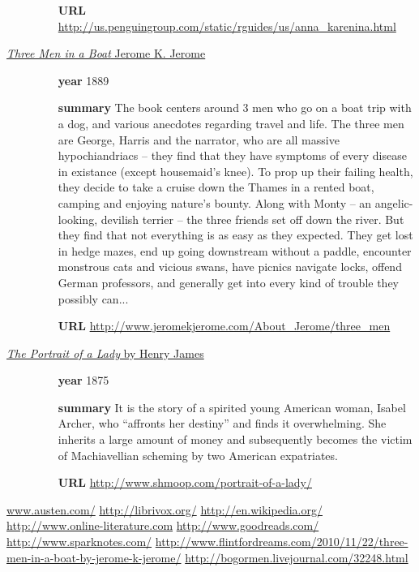 \documentclass[a4paper,11pt,oneside]{book}
\begin{document}
\begin{description}
\begin{itemize}
	\item [{\bf URL}] \url{http://us.penguingroup.com/static/rguides/us/anna_karenina.html}
	\end{itemize}
\item [\underline{{\it Three Men in a Boat} Jerome K. Jerome}] 
	\begin{itemize}
	\item [{\bf year}] 1889
	\item [{\bf summary}] The book centers around 3 men who go on a boat trip with a dog, and various anecdotes regarding travel and life. The three men are George, Harris and the narrator, who are all massive hypochiandriacs -- they find that they have symptoms of every disease in existance (except housemaid's knee). To prop up their failing health, they decide to take a cruise down the Thames in a rented boat, camping and enjoying nature's bounty. Along with Monty -- an angelic-looking, devilish terrier -- the three friends set off down the river. But they find that not everything is as easy as they expected. They get lost in hedge mazes, end up going downstream without a paddle, encounter monstrous cats and vicious swans, have picnics navigate locks, offend German professors, and generally get into every kind of trouble they possibly can...

	\item [{\bf URL}] \url{http://www.jeromekjerome.com/About_Jerome/three_men}
	\end{itemize}
\item [\underline{{\it The Portrait of a Lady} by Henry James}] 
	\begin{itemize}
	\item [{\bf year}] 1875
	\item [{\bf summary}] It is the story of a spirited young American woman, Isabel Archer, who “affronts her destiny” and finds it overwhelming. She inherits a large amount of money and subsequently becomes the victim of Machiavellian scheming by two American expatriates. 
	\item [{\bf URL}] \url{http://www.shmoop.com/portrait-of-a-lady/}
	\end{itemize}
\end{description}


\pagebreak
\begin{thebibliography}{XXX}
	 \url{www.austen.com/}
	 \url{http://librivox.org/}
	 \url{http://en.wikipedia.org/}
	 \url{http://www.online-literature.com}
	 \url{http://www.goodreads.com/}
	 \url{http://www.sparknotes.com/}
	 \url{http://www.flintfordreams.com/2010/11/22/three-men-in-a-boat-by-jerome-k-jerome/}
	 \url{http://bogormen.livejournal.com/32248.html}
\end{thebibliography}
\end{document}
